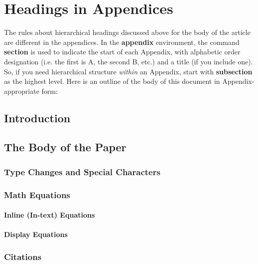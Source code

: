 \documentclass{acm_proc_article-sp}
\begin{document}
%


\cite{张明亮2012五子棋机器博弈系统评估函数的设计}
\cite{裴博文2008五子棋人工智能权重估值算法}
\cite{cnblogs1}
\cite{cnblogs2}
\cite{xqbase1}
\cite{xqbase2}
\cite{xqbase3}
%
%
\appendix
\section{Headings in Appendices}
The rules about hierarchical headings discussed above for
the body of the article are different in the appendices.
In the \textbf{appendix} environment, the command
\textbf{section} is used to
indicate the start of each Appendix, with alphabetic order
designation (i.e. the first is A, the second B, etc.) and
a title (if you include one).  So, if you need
hierarchical structure
\textit{within} an Appendix, start with \textbf{subsection} as the
highest level. Here is an outline of the body of this
document in Appendix-appropriate form:
\subsection{Introduction}
\subsection{The Body of the Paper}
\subsubsection{Type Changes and  Special Characters}
\subsubsection{Math Equations}
\paragraph{Inline (In-text) Equations}
\paragraph{Display Equations}
\subsubsection{Citations}
\end{document}
